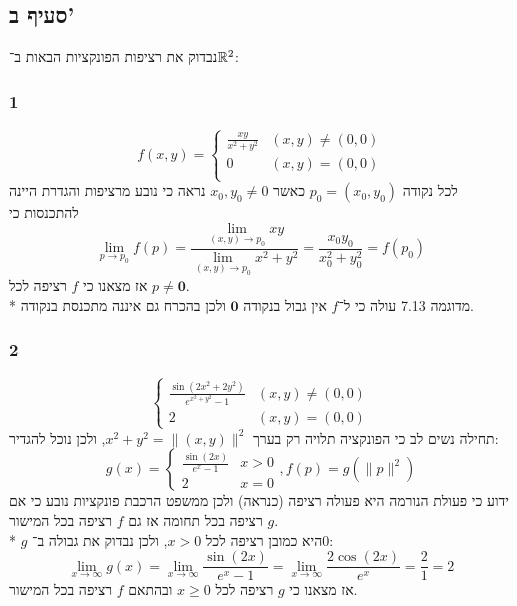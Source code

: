\subsection{סעיף ב'}
נבדוק את רציפות הפונקציות הבאות ב־$\mathbb{R}^2$:

\subsubsection{1}
\[
	f(x, y) = \begin{cases}
		\frac{xy}{x^2 + y^2} & (x, y) \ne (0, 0) \\
		0 & (x, y) = (0, 0) \\
	\end{cases}
\]
לכל נקודה $p_0 = (x_0, y_0)$ כאשר $x_0, y_0 \ne 0$ נראה כי נובע מרציפות והגדרת היינה להתכנסות כי
\[
	\lim_{p \to p_0} f(p)
	= \frac{\lim_{(x, y) \to p_0} xy}{\lim_{(x, y) \to p_0} x^2 + y^2}
	= \frac{x_0y_0}{x_0^2 + y_0^2}
	= f(p_0)
\]
אז מצאנו כי $f$ רציפה לכל $p \ne \textbf{0}$. \\*
מדוגמה 7.13 עולה כי ל־$f$ אין גבול בנקודה $\textbf{0}$ ולכן בהכרח גם איננה מתכנסת בנקודה.

\subsubsection{2}
\[
	\begin{cases}
		\frac{\sin(2x^2 + 2y^2)}{e^{x^2 + y^2} - 1} & (x, y) \ne (0, 0)\\
		2 & (x, y) = (0, 0)
	\end{cases}
\]
תחילה נשים לב כי הפונקציה תלויה רק בערך $x^2 + y^2 = \lVert (x, y) \rVert^2$, ולכן נוכל להגדיר:
\[
	g(x) = \begin{cases}
		\frac{\sin(2x)}{e^{x} - 1} & x > 0 \\
		2 & x = 0
	\end{cases},
	f(p) = g(\lVert p \rVert^2)
\]
ידוע כי פעולת הנורמה היא פעולה רציפה (כנראה) ולכן ממשפט הרכבת פונקציות נובע כי אם $g$ רציפה בכל תחומה אז גם $f$ רציפה בכל המישור. \\*
$g$ היא כמובן רציפה לכל $x > 0$, ולכן נבדוק את גבולה ב־$0$:
\[
	\lim_{x \to \infty} g(x)
	= \lim_{x \to \infty} \frac{\sin(2x)}{e^x - 1}
	= \lim_{x \to \infty} \frac{2\cos(2x)}{e^x}
	= \frac{2}{1}
	= 2
\]
אז מצאנו כי $g$ רציפה לכל $x \ge 0$ ובהתאם $f$ רציפה בכל המישור.

